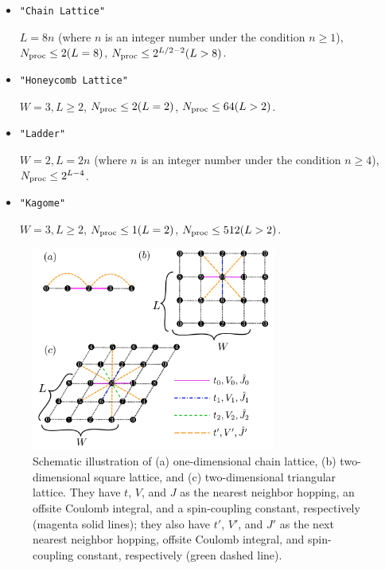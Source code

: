 \begin{itemize}
\begin{itemize}
  \item \verb|"Chain Lattice"|

    $L = 8n$ (where $n$ is an integer number under the condition  $n\geq1$),
    $N_{\rm proc} \leq 2(L=8)$, $N_{\rm proc} \leq 2^{L/2-2}(L>8)$.
    
  \item \verb|"Honeycomb Lattice"|

    $W=3, L \geq 2$, $N_{\rm proc} \leq 2(L=2)$, $N_{\rm proc} \leq 64(L>2)$.

  \item \verb|"Ladder"|

    $W=2, L = 2n$ (where $n$ is an integer number under the condition  $n\geq4$),
    $N_{\rm proc} \leq 2^{L-4}$.

  \item \verb|"Kagome"|

    $W=3, L \geq 2$, $N_{\rm proc} \leq 1(L=2)$, $N_{\rm proc} \leq 512(L>2)$.

\end{itemize}

\begin{figure}[!tbhp]
  \begin{center}
    \includegraphics[width=8cm]{../figs/chap04_1_lattice.pdf}
    \caption{Schematic illustration of
      (a) one-dimensional chain lattice, 
      (b) two-dimensional square lattice, and 
      (c) two-dimensional triangular lattice.
      They have $t$, $V$, and $J$ as the nearest neighbor hopping, an offsite Coulomb integral, 
      and a spin-coupling constant, respectively (magenta solid lines);
      they also have $t'$, $V'$, and $J'$ as the next nearest neighbor hopping, offsite Coulomb integral, 
      and spin-coupling constant, respectively (green dashed line).
    }
    \label{fig_chap04_1_lattice}
  \end{center}
\end{figure}


\end{itemize}
